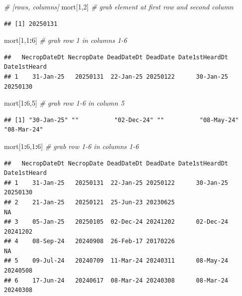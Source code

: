 \documentclass[
]{book}
\newenvironment{Shaded}{\begin{snugshade}}{\end{snugshade}}
\newcommand{\CommentTok}[1]{\textcolor[rgb]{0.56,0.35,0.01}{\textit{#1}}}
\newcommand{\DecValTok}[1]{\textcolor[rgb]{0.00,0.00,0.81}{#1}}
\newcommand{\NormalTok}[1]{#1}
\newcommand{\SpecialCharTok}[1]{\textcolor[rgb]{0.81,0.36,0.00}{\textbf{#1}}}
\begin{document}
\begin{Shaded}
\begin{Highlighting}[]
\CommentTok{\# [rows, columns]}
\NormalTok{mort[}\DecValTok{1}\NormalTok{,}\DecValTok{2}\NormalTok{] }\CommentTok{\# grab element at first row and second column}
\end{Highlighting}
\end{Shaded}

\begin{verbatim}
## [1] 20250131
\end{verbatim}

\begin{Shaded}
\begin{Highlighting}[]
\NormalTok{mort[}\DecValTok{1}\NormalTok{,}\DecValTok{1}\SpecialCharTok{:}\DecValTok{6}\NormalTok{] }\CommentTok{\# grab row 1 in columns 1{-}6}
\end{Highlighting}
\end{Shaded}

\begin{verbatim}
##   NecropDateDt NecropDate DeadDateDt DeadDate Date1stHeardDt Date1stHeard
## 1    31-Jan-25   20250131  22-Jan-25 20250122      30-Jan-25     20250130
\end{verbatim}

\begin{Shaded}
\begin{Highlighting}[]
\NormalTok{mort[}\DecValTok{1}\SpecialCharTok{:}\DecValTok{6}\NormalTok{,}\DecValTok{5}\NormalTok{] }\CommentTok{\# grab row 1{-}6 in column 5}
\end{Highlighting}
\end{Shaded}

\begin{verbatim}
## [1] "30-Jan-25" ""          "02-Dec-24" ""          "08-May-24" "08-Mar-24"
\end{verbatim}

\begin{Shaded}
\begin{Highlighting}[]
\NormalTok{mort[}\DecValTok{1}\SpecialCharTok{:}\DecValTok{6}\NormalTok{,}\DecValTok{1}\SpecialCharTok{:}\DecValTok{6}\NormalTok{] }\CommentTok{\# grab row 1{-}6 in columns 1{-}6}
\end{Highlighting}
\end{Shaded}

\begin{verbatim}
##   NecropDateDt NecropDate DeadDateDt DeadDate Date1stHeardDt Date1stHeard
## 1    31-Jan-25   20250131  22-Jan-25 20250122      30-Jan-25     20250130
## 2    21-Jan-25   20250121  25-Jun-23 20230625                          NA
## 3    05-Jan-25   20250105  02-Dec-24 20241202      02-Dec-24     20241202
## 4    08-Sep-24   20240908  26-Feb-17 20170226                          NA
## 5    09-Jul-24   20240709  11-Mar-24 20240311      08-May-24     20240508
## 6    17-Jun-24   20240617  08-Mar-24 20240308      08-Mar-24     20240308
\end{verbatim}
\end{document}
